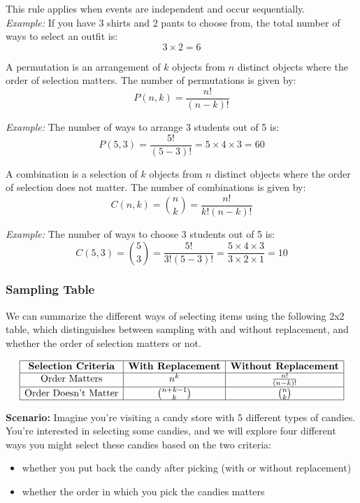 This rule applies when events are independent and occur sequentially. \\

\textit{Example:} If you have 3 shirts and 2 pants to choose from, the total number of ways to select an outfit is:
\[
3 \times 2 = 6
\]

\begin{definition}
    A permutation is an arrangement of \( k \) objects from \( n \) distinct objects where the order of selection matters. The number of permutations is given by:
\[
P(n, k) = \frac{n!}{(n-k)!}
\]
\end{definition}

\textit{Example:} The number of ways to arrange 3 students out of 5 is:
\[
P(5, 3) = \frac{5!}{(5-3)!} = 5 \times 4 \times 3 = 60
\]

\begin{definition}
    A combination is a selection of \( k \) objects from \( n \) distinct objects where the order of selection does not matter. The number of combinations is given by:
\[
C(n, k) = \binom{n}{k} = \frac{n!}{k!(n-k)!}
\]
\end{definition}

\textit{Example:} The number of ways to choose 3 students out of 5 is:
\[
C(5, 3) = \binom{5}{3} = \frac{5!}{3!(5-3)!} = \frac{5 \times 4 \times 3}{3 \times 2 \times 1} = 10
\]

\subsubsection{Sampling Table}

We can summarize the different ways of selecting items using the following 2x2 table, which distinguishes between sampling with and without replacement, and whether the order of selection matters or not.

\[
\begin{array}{|c|c|c|}
\hline
\textbf{Selection Criteria} & \textbf{With Replacement} & \textbf{Without Replacement} \\
\hline
\text{Order Matters} & n^k & \frac{n!}{(n-k)!} \\
\hline
\text{Order Doesn't Matter} & \binom{n+k-1}{k} & \binom{n}{k} \\
\hline
\end{array}
\]
\vspace{5pt}

\textbf{Scenario:} Imagine you're visiting a candy store with 5 different types of candies. You're interested in selecting some candies, and we will explore four different ways you might select these candies based on the two criteria: 
\begin{itemize}
    \item whether you put back the candy after picking (with or without replacement)
    \item whether the order in which you pick the candies matters
\end{itemize} 

